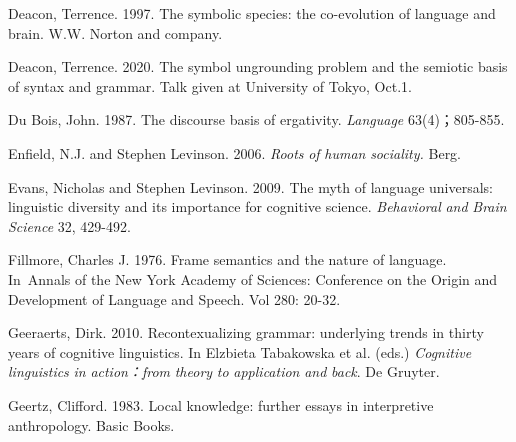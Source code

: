 \begin{stylereferences}
Deacon, Terrence. 1997. The symbolic species: the co-evolution of language and brain. W.W. Norton and company.
\end{stylereferences}

\begin{stylereferences}
Deacon, Terrence. 2020. The symbol ungrounding problem and the semiotic basis of syntax and grammar. Talk given at University of Tokyo, Oct.1.
\end{stylereferences}

\begin{stylereferences}
Du Bois, John. 1987. The discourse basis of ergativity. \textit{Language} 63(4)；805-855.
\end{stylereferences}

\begin{stylereferences}
Enfield, N.J. and Stephen Levinson. 2006. \textit{Roots} \textit{of} \textit{human} \textit{sociality.} Berg.
\end{stylereferences}

\begin{stylereferences}
Evans, Nicholas and Stephen Levinson. 2009. The myth of language universals: linguistic diversity and its importance for cognitive science. \textit{Behavioral} \textit{and} \textit{Brain} \textit{Science} 32, 429-492.
\end{stylereferences}

\begin{stylereferences}
Fillmore, Charles J. 1976. Frame semantics and the nature of language.  In~Annals of the New York Academy of Sciences: Conference on the Origin and Development of Language and Speech. Vol 280: 20-32.
\end{stylereferences}

\begin{stylereferences}
Geeraerts, Dirk. 2010. Recontexualizing grammar: underlying trends in thirty years of cognitive linguistics. In Elzbieta Tabakowska et al. (eds.) \textit{Cognitive} \textit{linguistics} \textit{in} \textit{action：from} \textit{theory} \textit{to} \textit{application} \textit{and} \textit{back}. De Gruyter.
\end{stylereferences}

\begin{stylereferences}
Geertz, Clifford. 1983. Local knowledge: further essays in interpretive anthropology. Basic Books.  ~
\end{stylereferences}

